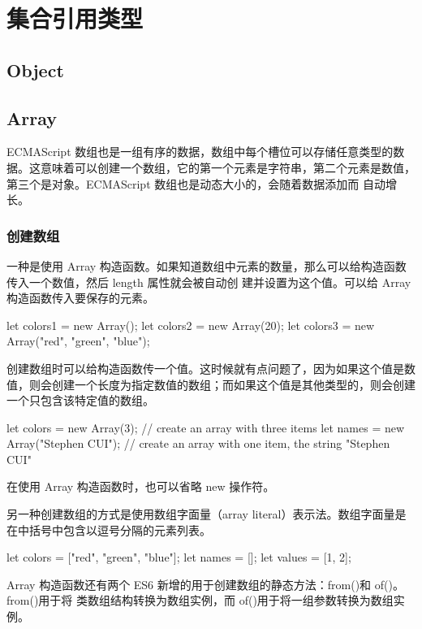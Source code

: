 \chapter{集合引用类型}
\section{Object}
\section{Array}
ECMAScript 数组也是一组有序的数据，数组中每个槽位可以存储任意类型的数据。这意味着可以创建一个数组，它的第一个元素是字符串，第二个元素是数值，第三个是对象。ECMAScript 数组也是动态大小的，会随着数据添加而
自动增长。
\subsection{创建数组}
一种是使用 Array 构造函数。如果知道数组中元素的数量，那么可以给构造函数传入一个数值，然后 length 属性就会被自动创
建并设置为这个值。可以给 Array 构造函数传入要保存的元素。
\begin{js}
let colors1 = new Array();
let colors2 = new Array(20);
let colors3 = new Array("red", "green", "blue");
\end{js}

创建数组时可以给构造函数传一个值。这时候就有点问题了，因为如果这个值是数值，则会创建一个长度为指定数值的数组；而如果这个值是其他类型的，则会创建一个只包含该特定值的数组。

\begin{js}
let colors = new Array(3);
// create an array with three items
let names = new Array("Stephen CUI");
// create an array with one item, the string "Stephen CUI"
\end{js}
在使用 Array 构造函数时，也可以省略 new 操作符。

另一种创建数组的方式是使用数组字面量（array literal）表示法。数组字面量是在中括号中包含以逗号分隔的元素列表。

\begin{js}
let colors = ["red", "green", "blue"];
let names = [];
let values = [1, 2];
\end{js}


Array 构造函数还有两个 ES6 新增的用于创建数组的静态方法：from()和 of()。from()用于将
类数组结构转换为数组实例，而 of()用于将一组参数转换为数组实例。


